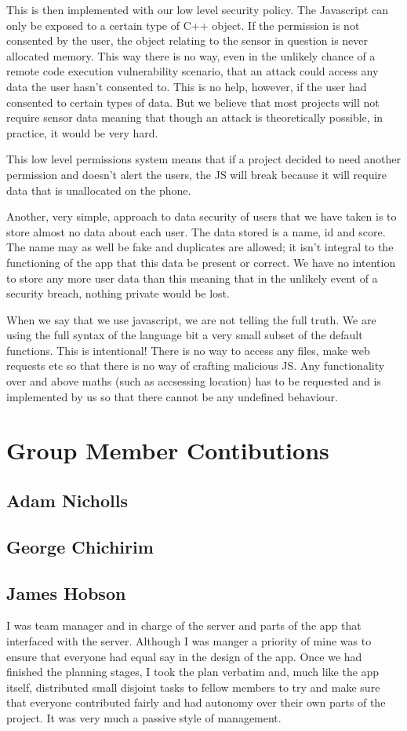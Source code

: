 \documentclass{article}
\begin{document}
This is then implemented with our low level security policy. The Javascript can only be exposed to a certain type of C++ object.
If the permission is not consented by the user, the object relating to the sensor in question is never allocated memory. This way
there is no way, even in the unlikely chance of a remote code execution vulnerability scenario, that an attack could access any data
the user hasn't consented to. This is no help, however, if the user had consented to certain types of data. But we believe that most projects
will not require sensor data meaning that though an attack is theoretically possible, in practice, it would be very hard.

This low level permissions system means that if a project decided to need another permission and doesn't alert the users, the JS will break
because it will require data that is unallocated on the phone.

Another, very simple, approach to data security of users that we have taken is to store almost no data about each user. The data stored is
a name, id and score. The name may as well be fake and duplicates are allowed; it isn't integral to the functioning of the app that this data
be present or correct. We have no intention to store any more user data than this meaning  that in the unlikely event of a security breach,
nothing private would be lost.

When we say that we use javascript, we are not telling the full truth. We are using the full syntax of the language bit a very small
subset of the default functions. This is intentional! There is no way to access any files, make web requests etc so that there is
no way of crafting malicious JS. Any functionality over and above maths (such as accsessing location) has to be requested and is implemented
by us so that there cannot be any undefined behaviour.

\section{Group Member Contibutions}
\subsection{Adam Nicholls}
\subsection{George Chichirim}
\subsection{James Hobson}
I was team manager and in charge of the server and parts of the app that interfaced with the server. Although I was manger a priority of mine
was to ensure that everyone had equal say in the design of the app. Once we had finished the planning stages, I took the plan verbatim and,
much like the app itself, distributed small disjoint tasks to fellow members to try and make sure that everyone contributed fairly
and had autonomy over their own parts of the project. It was very much a passive style of management.
\end{document}
